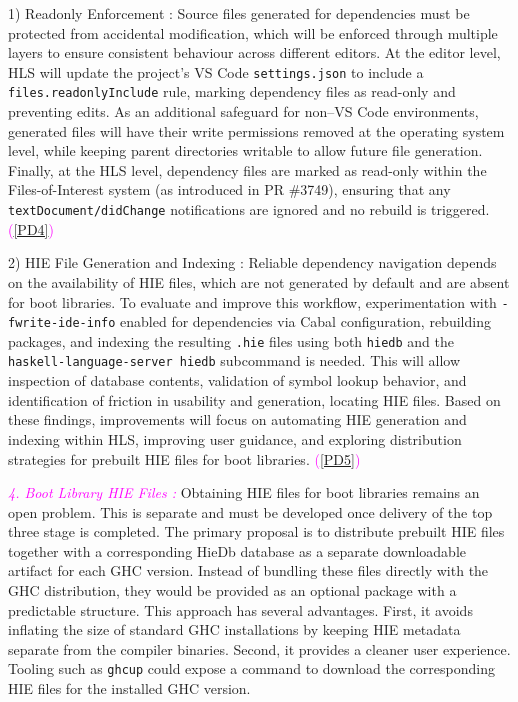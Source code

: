 \documentclass[a4paper,12pt]{article}
\begin{document}
1) Readonly Enforcement :     Source files generated for dependencies must be protected from accidental modification, which will be enforced through multiple layers to ensure consistent behaviour across different editors. At the editor level, HLS will update the project's VS Code \texttt{settings.json} to include a \texttt{files.readonlyInclude} rule, marking dependency files as read-only and preventing edits. As an additional safeguard for non–VS Code environments, generated files will have their write permissions removed at the operating system level, while keeping parent directories writable to allow future file generation. Finally, at the HLS level, dependency files are marked as read-only within the Files-of-Interest system (as introduced in PR \#3749), ensuring that any \texttt{textDocument/didChange} notifications are ignored and no rebuild is triggered. \textcolor{magenta}{(\ref{PD4})}

\vspace{0.6em}
2) HIE File Generation and Indexing : Reliable dependency navigation depends on the availability of HIE files, which are not generated by default and are absent for boot libraries. To evaluate and improve this workflow, experimentation with \texttt{-fwrite-ide-info} enabled for dependencies via Cabal configuration, rebuilding packages, and indexing the resulting \texttt{.hie} files using both \texttt{hiedb} and the \texttt{haskell-language-server hiedb} subcommand is needed. This will allow inspection of database contents, validation of symbol lookup behavior, and identification of friction in usability and generation, locating HIE files. Based on these findings, improvements will focus on automating HIE generation and indexing within HLS, improving user guidance, and exploring distribution strategies for prebuilt HIE files for boot libraries. \textcolor{magenta}{(\ref{PD5})}
\vspace{0.6em}

\textcolor{magenta}{\textit{4. Boot Library HIE Files :  }}
Obtaining HIE files for boot libraries remains an open problem. This is separate and must be developed once delivery of the top three stage is completed.
\vspace{0.6em}
The primary proposal is to distribute prebuilt HIE files together with a corresponding HieDb database as a separate downloadable artifact for each GHC version. Instead of bundling these files directly with the GHC distribution, they would be provided as an optional package with a predictable structure. This approach has several advantages. First, it avoids inflating the size of standard GHC installations by keeping HIE metadata separate from the compiler binaries. Second, it provides a cleaner user experience. Tooling such as \texttt{ghcup} could expose a command to download the corresponding HIE files for the installed GHC version.
\vspace{0.6em}
\end{document}
